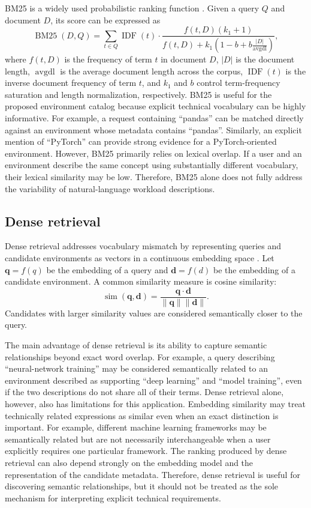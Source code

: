 BM25 is a widely used probabilistic ranking function \cite{bm25}. Given a query \(Q\) and document \(D\), its score can be expressed as
\[
    \operatorname{BM25}(D,Q)
    =
    \sum_{t\in Q}
    \operatorname{IDF}(t)
    \cdot
    \frac{
        f(t,D)(k_1+1)
    }{
        f(t,D)+k_1
        \left(
            1-b+b\frac{|D|}{\operatorname{avgdl}}
        \right)
    },
\]
where \(f(t,D)\) is the frequency of term \(t\) in document \(D\), \(|D|\) is the document length, \(\operatorname{avgdl}\) is the average document length across the corpus, \(\operatorname{IDF}(t)\) is the inverse document frequency of term \(t\), and \(k_1\) and \(b\) control term-frequency saturation and length normalization, respectively. BM25 is useful for the proposed environment catalog because explicit technical vocabulary can be highly informative. For example, a request containing ``pandas'' can be matched directly against an environment whose metadata contains ``pandas''. Similarly, an explicit mention of ``PyTorch'' can provide strong evidence for a PyTorch-oriented environment. However, BM25 primarily relies on lexical overlap. If a user and an environment describe the same concept using substantially different vocabulary, their lexical similarity may be low. Therefore, BM25 alone does not fully address the variability of natural-language workload descriptions.

\subsection{Dense retrieval}\label{subsec:dense_theory}

Dense retrieval addresses vocabulary mismatch by representing queries and candidate environments as vectors in a continuous embedding space \cite{sentencebert,dpr,sparse_dense}. Let \(\mathbf{q} = f(q)\) be the embedding of a query and \(\mathbf{d} = f(d)\) be the embedding of a candidate environment. A common similarity measure is cosine similarity:
\[
    \operatorname{sim}(\mathbf{q},\mathbf{d})
    =
    \frac{\mathbf{q}\cdot\mathbf{d}}{\|\mathbf{q}\|\|\mathbf{d}\|}.
\]
Candidates with larger similarity values are considered semantically closer to the query.

The main advantage of dense retrieval is its ability to capture semantic relationships beyond exact word overlap. For example, a query describing ``neural-network training'' may be considered semantically related to an environment described as supporting ``deep learning'' and ``model training'', even if the two descriptions do not share all of their terms. Dense retrieval alone, however, also has limitations for this application. Embedding similarity may treat technically related expressions as similar even when an exact distinction is important. For example, different machine learning frameworks may be semantically related but are not necessarily interchangeable when a user explicitly requires one particular framework. The ranking produced by dense retrieval can also depend strongly on the embedding model and the representation of the candidate metadata. Therefore, dense retrieval is useful for discovering semantic relationships, but it should not be treated as the sole mechanism for interpreting explicit technical requirements.

